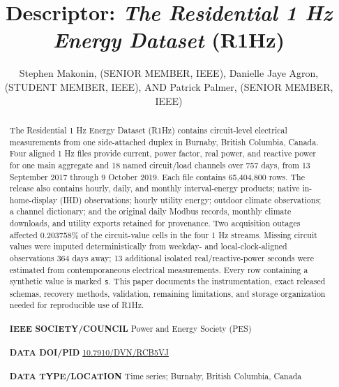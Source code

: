 \documentclass{IEEEoj-data}
\begin{document}

\title{{\color{black}\textbf{Descriptor:}} \textit{The Residential 1 Hz Energy Dataset} (R1Hz)}

\author{Stephen Makonin, (SENIOR MEMBER, IEEE), Danielle Jaye Agron, (STUDENT MEMBER, IEEE), AND Patrick Palmer, (SENIOR MEMBER, IEEE)}

\begin{abstract}
The Residential 1 Hz Energy Dataset (R1Hz) contains circuit-level electrical measurements from one side-attached duplex in Burnaby, British Columbia, Canada. Four aligned 1 Hz files provide current, power factor, real power, and reactive power for one main aggregate and 18 named circuit/load channels over 757 days, from 13 September 2017 through 9 October 2019. Each file contains 65,404,800 rows. The release also contains hourly, daily, and monthly interval-energy products; native in-home-display (IHD) observations; hourly utility energy; outdoor climate observations; a channel dictionary; and the original daily Modbus records, monthly climate downloads, and utility exports retained for provenance. Two acquisition outages affected 0.203758\% of the circuit-value cells in the four 1 Hz streams. Missing circuit values were imputed deterministically from weekday- and local-clock-aligned observations 364 days away; 13 additional isolated real/reactive-power seconds were estimated from contemporaneous electrical measurements. Every row containing a synthetic value is marked \texttt{s}. This paper documents the instrumentation, exact released schemas, recovery methods, validation, remaining limitations, and storage organization needed for reproducible use of R1Hz.\\
\\
{\textcolor{ieeedata}{\abstractheadfont\bfseries{IEEE SOCIETY/COUNCIL}}} Power and Energy Society (PES)\\
\\
{\textcolor{ieeedata}{\abstractheadfont\bfseries{DATA DOI/PID}}} \href{https://doi.org/10.7910/DVN/RCB5VJ}{10.7910/DVN/RCB5VJ}\\
\\
{\textcolor{ieeedata}{\abstractheadfont\bfseries{DATA TYPE/LOCATION}}} Time series; Burnaby, British Columbia, Canada
\end{abstract}
\end{document}
